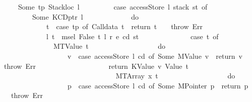 \begin{isabellebody}
\ \ \ \ \ \ Some\ {\isacharparenleft}{\kern0pt}tp{\isacharcomma}{\kern0pt}\ {\isacharparenleft}{\kern0pt}Stackloc\ l{\isacharparenright}{\kern0pt}{\isacharparenright}{\kern0pt}\ {\isasymRightarrow}\isanewline
\ \ \ \ \ \ \ \ {\isacharparenleft}{\kern0pt}case\ accessStore\ l\ {\isacharparenleft}{\kern0pt}stack\ st{\isacharparenright}{\kern0pt}\ of\isanewline
\ \ \ \ \ \ \ \ \ \ Some\ {\isacharparenleft}{\kern0pt}KCDptr\ l{\isacharprime}{\kern0pt}{\isacharparenright}{\kern0pt}\ {\isasymRightarrow}\isanewline
\ \ \ \ \ \ \ \ \ \ \ \ do\ {\isacharbraceleft}{\kern0pt}\isanewline
\ \ \ \ \ \ \ \ \ \ \ \ \ \ t\ {\isasymleftarrow}\ case\ tp\ of\ Calldata\ t\ {\isasymRightarrow}\ return\ t\ {\isacharbar}{\kern0pt}\ {\isacharunderscore}{\kern0pt}\ {\isasymRightarrow}\ throw\ Err{\isacharsemicolon}{\kern0pt}\isanewline
\ \ \ \ \ \ \ \ \ \ \ \ \ \ {\isacharparenleft}{\kern0pt}l{\isacharprime}{\kern0pt}{\isacharprime}{\kern0pt}{\isacharcomma}{\kern0pt}\ t{\isacharprime}{\kern0pt}{\isacharparenright}{\kern0pt}\ {\isasymleftarrow}\ msel\ False\ t\ l{\isacharprime}{\kern0pt}\ r\ e\ cd\ st{\isacharsemicolon}{\kern0pt}\isanewline
\ \ \ \ \ \ \ \ \ \ \ \ \ \ {\isacharparenleft}{\kern0pt}case\ t{\isacharprime}{\kern0pt}\ of\isanewline
\ \ \ \ \ \ \ \ \ \ \ \ \ \ \ \ MTValue\ t{\isacharprime}{\kern0pt}{\isacharprime}{\kern0pt}\ {\isasymRightarrow}\isanewline
\ \ \ \ \ \ \ \ \ \ \ \ \ \ \ \ \ \ do\ {\isacharbraceleft}{\kern0pt}\isanewline
\ \ \ \ \ \ \ \ \ \ \ \ \ \ \ \ \ \ \ \ v\ {\isasymleftarrow}\ case\ accessStore\ l{\isacharprime}{\kern0pt}{\isacharprime}{\kern0pt}\ cd\ of\ Some\ {\isacharparenleft}{\kern0pt}MValue\ v{\isacharparenright}{\kern0pt}\ {\isasymRightarrow}\ return\ v\ {\isacharbar}{\kern0pt}\ {\isacharunderscore}{\kern0pt}\ {\isasymRightarrow}\ throw\ Err{\isacharsemicolon}{\kern0pt}\isanewline
\ \ \ \ \ \ \ \ \ \ \ \ \ \ \ \ \ \ \ \ return\ {\isacharparenleft}{\kern0pt}KValue\ v{\isacharcomma}{\kern0pt}\ Value\ t{\isacharprime}{\kern0pt}{\isacharprime}{\kern0pt}{\isacharparenright}{\kern0pt}\isanewline
\ \ \ \ \ \ \ \ \ \ \ \ \ \ \ \ \ \ {\isacharbraceright}{\kern0pt}\isanewline
\ \ \ \ \ \ \ \ \ \ \ \ \ \ {\isacharbar}{\kern0pt}\ MTArray\ x\ t{\isacharprime}{\kern0pt}{\isacharprime}{\kern0pt}\ {\isasymRightarrow}\isanewline
\ \ \ \ \ \ \ \ \ \ \ \ \ \ \ \ \ \ do\ {\isacharbraceleft}{\kern0pt}\isanewline
\ \ \ \ \ \ \ \ \ \ \ \ \ \ \ \ \ \ \ \ p\ {\isasymleftarrow}\ case\ accessStore\ l{\isacharprime}{\kern0pt}{\isacharprime}{\kern0pt}\ cd\ of\ Some\ {\isacharparenleft}{\kern0pt}MPointer\ p{\isacharparenright}{\kern0pt}\ {\isasymRightarrow}\ return\ p\ {\isacharbar}{\kern0pt}\ {\isacharunderscore}{\kern0pt}\ {\isasymRightarrow}\ throw\ Err{\isacharsemicolon}{\kern0pt}\isanewline

\end{isabellebody}
